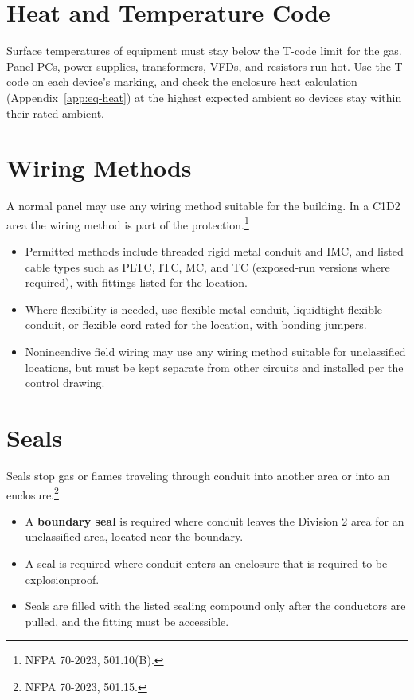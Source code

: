 \section{Heat and Temperature Code}
Surface temperatures of equipment must stay below the T-code limit for the gas. Panel PCs, power supplies, transformers, VFDs, and resistors run hot. Use the T-code on each device's marking, and check the enclosure heat calculation (Appendix~\ref{app:eq-heat}) at the highest expected ambient so devices stay within their rated ambient.

\section{Wiring Methods}
A normal panel may use any wiring method suitable for the building. In a C1D2 area the wiring method is part of the protection.\footnote{NFPA 70-2023, 501.10(B).}
\begin{itemize}[itemsep=1pt]
  \item Permitted methods include threaded rigid metal conduit and IMC, and listed cable types such as PLTC, ITC, MC, and TC (exposed-run versions where required), with fittings listed for the location.
  \item Where flexibility is needed, use flexible metal conduit, liquidtight flexible conduit, or flexible cord rated for the location, with bonding jumpers.
  \item Nonincendive field wiring may use any wiring method suitable for unclassified locations, but must be kept separate from other circuits and installed per the control drawing.
\end{itemize}

\section{Seals}
Seals stop gas or flames traveling through conduit into another area or into an enclosure.\footnote{NFPA 70-2023, 501.15.}
\begin{itemize}[itemsep=1pt]
  \item A \textbf{boundary seal} is required where conduit leaves the Division 2 area for an unclassified area, located near the boundary.
  \item A seal is required where conduit enters an enclosure that is required to be explosionproof.
  \item Seals are filled with the listed sealing compound only after the conductors are pulled, and the fitting must be accessible.
\end{itemize}

